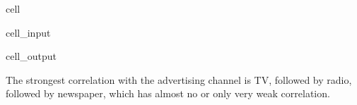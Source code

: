 \documentclass[letterpaper,10pt,english]{jupyterBook}
\begin{document}
\begin{sphinxuseclass}{cell}\begin{sphinxVerbatimInput}

\begin{sphinxuseclass}{cell_input}
\begin{sphinxVerbatim}[commandchars=\\\{\}]
\end{sphinxVerbatim}

\end{sphinxuseclass}\end{sphinxVerbatimInput}
\begin{sphinxVerbatimOutput}

\begin{sphinxuseclass}{cell_output}
\noindent{}

\noindent{}

\noindent{}

\end{sphinxuseclass}\end{sphinxVerbatimOutput}

\end{sphinxuseclass}
\sphinxAtStartPar
The strongest correlation with the advertising channel is TV, followed by radio, followed by newspaper, which has almost no or only very weak correlation.
\end{document}
